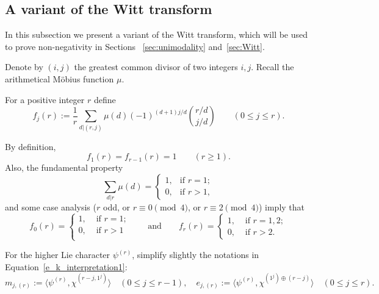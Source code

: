 \documentclass[ALCO,published]{cedram}
\begin{document}
\subsection{A variant of the Witt transform}
\label{sec:Witt-subsec}
 
In this subsection we present a variant of the Witt transform, which will be used to prove non-negativity in Sections ~\ref{sec:unimodality} and~\ref{sec:Witt}.
    
Denote by $(i,j)$ the greatest common divisor of two integers $i,j$. Recall the arithmetical M\"obius function $\mu$. 
    
\begin{definition}\label{def:f}
    For a positive integer $r$ define 
    \[
        f_j(r) 
        := \frac{1}{r} \sum_{d|(r,j)} \mu(d)(-1)^{(d+1)j/d} \binom{r/d}{j/d} 
	   \qquad (0\le j\le r). 
    \]
\end{definition}
   
\begin{observation}\label{obs:f_values}
    By definition, 
    \[
        f_1(r) = f_{r-1}(r) = 1
        \qquad (r \ge 1).
    \]
    Also, the fundamental property
    \[
        \sum_{d|r} \mu(d) = 
        \begin{cases}
            1, &\text{if } r=1; \\
            0, &\text{if } r>1,
        \end{cases}
    \]
    and some case analysis ($r$ odd, or $r \equiv 0 \pmod 4$, or $r \equiv 2 \pmod 4$) imply that
    \[
        f_0(r) = 
        \begin{cases} 
            1,&\text{ if }  r=1;\\
            0,&\text{ if } r>1\\
        \end{cases}
        \qquad \text{and} \qquad
        f_r(r) = 
        \begin{cases} 
            1,&\text{ if }  r=1,2;\\
            0,&\text{ if } r>2.
        \end{cases}
    \]
\end{observation}
      
For the higher Lie character $\psi^{(r)}$, 
simplify slightly the notations in Equation~\eqref{e_k_interpretation1}:
\[
    m_{j,(r)}
    := \langle \psi^{(r)},\chi^{(r-j,1^j)} \rangle 
    \quad (0 \le j \le r-1), \quad
    e_{j,(r)} 
    :=\langle \psi^{(r)},\chi^{(1^j)\oplus(r-j)} \rangle
    \quad (0 \le j \le r).
\]
\end{document}

